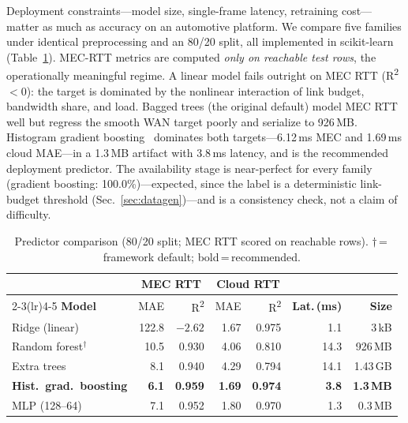 \documentclass[10pt,conference]{IEEEtran}
\begin{document}
Deployment constraints---model size, single-frame
latency, retraining cost---matter as much as accuracy on an automotive
platform.  We compare five families under identical preprocessing and an
80/20 split, all implemented in scikit-learn~\cite{pedregosa2011sklearn}
(Table~\ref{tab:predictors}).  MEC-RTT metrics are computed
\emph{only on reachable test rows}, the operationally meaningful regime.
A linear model fails outright on MEC RTT (R\textsuperscript{2} $<0$): the
target is dominated by the nonlinear interaction of link budget,
bandwidth share, and load.  Bagged trees (the original default) model
MEC RTT well but regress the smooth WAN target poorly and serialize to
926\,MB.  Histogram gradient boosting~\cite{friedman2001} dominates both
targets---6.12\,ms MEC and 1.69\,ms cloud MAE---in a 1.3\,MB artifact
with 3.8\,ms latency, and is the recommended deployment predictor.  The availability stage is near-perfect for every
family (gradient boosting: 100.0\%)---expected, since the label is a
deterministic link-budget threshold (Sec.~\ref{sec:datagen})---and is a
consistency check, not a claim of difficulty.

\begin{table}[t]
\centering
\caption{Predictor comparison (80/20 split; MEC RTT scored on reachable
rows). $\dagger$\,=\,framework default; bold\,=\,recommended.}
\label{tab:predictors}
\scriptsize\setlength{\tabcolsep}{3.2pt}
\begin{tabular}{@{}lrrrrrr@{}}
\toprule
 & \multicolumn{2}{c}{\textbf{MEC RTT}} & \multicolumn{2}{c}{\textbf{Cloud RTT}} & & \\
\cmidrule(lr){2-3}\cmidrule(lr){4-5}
\textbf{Model} & MAE & R\textsuperscript{2} & MAE & R\textsuperscript{2} &
\textbf{Lat.\,(ms)} & \textbf{Size} \\
\midrule
Ridge (linear)      & 122.8 & $-2.62$ & 1.67 & 0.975 &  1.1 & 3\,kB \\
Random forest$^\dagger$~\cite{breiman2001} & 10.5 & 0.930 & 4.06 & 0.810 & 14.3 & 926\,MB \\
Extra trees         &  8.1 & 0.940 & 4.29 & 0.794 & 14.1 & 1.43\,GB \\
\textbf{Hist.\ grad.\ boosting} & \textbf{6.1} & \textbf{0.959} & \textbf{1.69} & \textbf{0.974} & \textbf{3.8} & \textbf{1.3\,MB} \\
MLP (128--64)       &  7.1 & 0.952 & 1.80 & 0.970 &  1.3 & 0.3\,MB \\
\bottomrule
\end{tabular}
\end{table}
\end{document}
